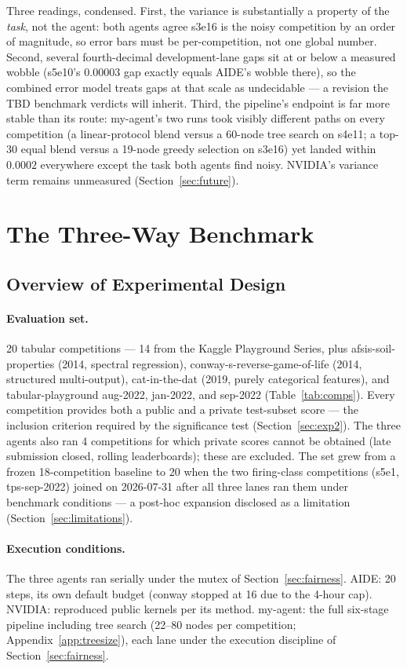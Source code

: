 \documentclass[11pt,a4paper]{article}
\begin{document}
Three readings, condensed. First, the variance is substantially a property of the \emph{task},
not the agent: both agents agree s3e16 is the noisy competition by an order of magnitude, so
error bars must be per-competition, not one global number. Second, several fourth-decimal
development-lane gaps sit at or below a measured wobble (s5e10's $0.00003$ gap exactly equals
AIDE's wobble there), so the combined error model treats gaps at that scale as undecidable ---
a revision the TBD benchmark verdicts will inherit. Third, the pipeline's endpoint is far more
stable than its route: my-agent's two runs took visibly different paths on every competition (a
linear-protocol blend versus a 60-node tree search on s4e11; a top-30 equal blend versus a
19-node greedy selection on s3e16) yet landed within $0.0002$ everywhere except the task both
agents find noisy. NVIDIA's variance term remains unmeasured (Section~\ref{sec:future}).

\section{The Three-Way Benchmark}

\subsection{Overview of Experimental Design}

\paragraph{Evaluation set.} 20 tabular competitions --- 14 from the Kaggle Playground Series, plus afsis-soil-properties (2014, spectral regression), conway-s-reverse-game-of-life (2014, structured multi-output), cat-in-the-dat (2019, purely categorical features), and tabular-playground aug-2022, jan-2022, and sep-2022 (Table~\ref{tab:comps}). Every competition provides both a public and a private test-subset score --- the inclusion criterion required by the significance test (Section~\ref{sec:exp2}). The three agents also ran 4 competitions for which private scores cannot be obtained (late submission closed, rolling leaderboards); these are excluded. The set grew from a frozen 18-competition baseline to 20 when the two firing-class competitions (s5e1, tps-sep-2022) joined on 2026-07-31 after all three lanes ran them under benchmark conditions --- a post-hoc expansion disclosed as a limitation (Section~\ref{sec:limitations}).

\paragraph{Execution conditions.} The three agents ran serially under the mutex of Section~\ref{sec:fairness}. AIDE: 20 steps, its own default budget (conway stopped at 16 due to the 4-hour cap). NVIDIA: reproduced public kernels per its method. my-agent: the full six-stage pipeline including tree search (22--80 nodes per competition; Appendix~\ref{app:treesize}), each lane under the execution discipline of Section~\ref{sec:fairness}.
\end{document}
